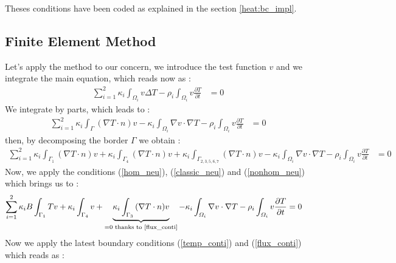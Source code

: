 \noindent Theses conditions have been coded as explained in the section \ref{heat:bc_impl}.

\subsection{Finite Element Method}
Let's apply the method to our concern, we introduce the test function $v$ and we integrate the main equation, which reads now as :
\begin{equation}
   \begin{split}
      \displaystyle{\sum_{i=1}^{2} \kappa_i \int_{\varOmega_i} v\Delta T -  \rho_i \int_{\varOmega_i} v\frac{ \partial T}{\partial t}}  & = 0  
  \end{split}
\end{equation}
We integrate by parts, which leads to :
\begin{equation}
   \begin{split}
      \displaystyle{\sum_{i=1}^{2} \kappa_i \int_\Gamma {(\nabla T \cdot n) v} - \kappa_i \int_{\varOmega_i} {\nabla v \cdot \nabla T}  - \rho_i \int_{\varOmega_i} v\frac{ \partial T}{\partial t}}  & = 0
  \end{split}
\end{equation}
then, by decomposing the border $\Gamma$ we obtain :
\begin{equation}
   \begin{split}
 \displaystyle{\sum_{i=1}^{2} \kappa_i \int_{\Gamma_1}{(\nabla T \cdot n) v} + \kappa_i \int_{\Gamma_4} {(\nabla T \cdot n) v} + \kappa_i \int_{\Gamma_{2,3,5,6,7}}{(\nabla T \cdot n) v}  - \kappa_i \int_{\varOmega_i} {\nabla v \cdot \nabla T}	- \rho_i \int_{\varOmega_i} v\frac{ \partial T}{\partial t}} & =   0 
  \end{split}
\end{equation}
Now, we apply the conditions (\ref{hom_neu}), (\ref{classic_neu}) and (\ref{nonhom_neu}) which brings us to :
\begin{equation}
   \begin{split}
 \displaystyle{\sum_{i=1}^{2} \kappa_i B \int_{\Gamma_1}{T v} + \kappa_i \int_{\Gamma_4} {v} + \underbrace{\kappa_i \int_{\Gamma_3}{(\nabla T \cdot n) v}}_{\text{=0 thanks to \ref{flux_conti}}}  - \kappa_i \int_{\varOmega_i} {\nabla v \cdot \nabla T}	- \rho_i \int_{\varOmega_i} v\frac{ \partial T}{\partial t}} & =   0 
  \end{split}
\end{equation}
Now we apply the latest boundary conditions (\ref{temp_conti}) and (\ref{flux_conti}) which reads as :
